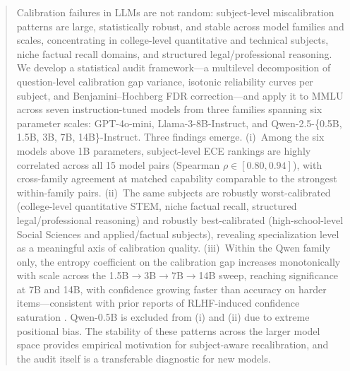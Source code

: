 \documentclass{article}
\begin{document}

\printAffiliationsAndNotice{}

\begin{abstract}
Calibration failures in LLMs are not random: subject-level miscalibration
patterns are large, statistically robust, and stable across model families
and scales, concentrating in college-level quantitative and technical subjects,
niche factual recall domains, and structured legal/professional reasoning.
We develop a statistical audit framework---a multilevel decomposition of
question-level calibration gap variance, isotonic reliability curves per subject,
and Benjamini--Hochberg FDR correction---and apply it
to MMLU across seven instruction-tuned models from three families spanning six
parameter scales: GPT-4o-mini, Llama-3-8B-Instruct, and Qwen-2.5-\{0.5B, 1.5B,
3B, 7B, 14B\}-Instruct. Three findings emerge. (i)~Among the six models above 1B parameters,
subject-level ECE rankings are highly correlated across all 15 model pairs
(Spearman $\rho \in [0.80, 0.94]$), with cross-family agreement at matched
capability comparable to the strongest within-family pairs. (ii)~The same subjects
are robustly worst-calibrated (college-level quantitative STEM, niche factual
recall, structured legal/professional reasoning) and robustly best-calibrated
(high-school-level Social Sciences and applied/factual subjects), revealing
specialization level as a meaningful axis of calibration quality. (iii)~Within the Qwen family only, the entropy coefficient on the
calibration gap increases monotonically with scale across the 1.5B$\to$3B$\to$7B$\to$14B
sweep, reaching significance at 7B and 14B, with confidence growing faster
than accuracy on harder items---consistent with prior
reports of RLHF-induced confidence saturation
\citep{kadavath2022language, nakkiran2025trained}.
Qwen-0.5B is excluded from (i) and (ii) due to extreme positional bias.
The stability of these patterns across the larger model space
provides empirical motivation for subject-aware recalibration,
and the audit itself is a transferable diagnostic for new models.
\end{abstract}
\end{document}
